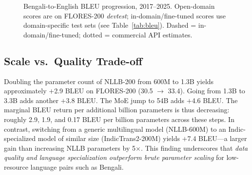 \documentclass[conference]{IEEEtran}
\begin{document}
\begin{figure}[htbp]
\centering
{}
\caption{Bengali-to-English BLEU progression, 2017--2025. Open-domain scores
are on FLORES-200 \textit{devtest}; in-domain/fine-tuned scores use
domain-specific test sets (see Table~\ref{tab:bleu}). Dashed = in-domain/fine-tuned;
dotted = commercial API estimates.}
\label{fig:bleu_trend}
\end{figure}

\subsection{Scale vs.\ Quality Trade-off}

Doubling the parameter count of NLLB-200 from 600M to 1.3B yields
approximately $+$2.9 BLEU on FLORES-200 (30.5 $\to$ 33.4).
Going from 1.3B to 3.3B adds another $+$3.8 BLEU.
The MoE jump to 54B adds $+$4.6 BLEU.
The marginal BLEU return per additional billion parameters is thus
decreasing: roughly 2.9, 1.9, and 0.17 BLEU per billion parameters
across these steps.
In contrast, switching from a generic multilingual model (NLLB-600M)
to an Indic-specialized model of similar size (IndicTrans2-200M) yields
$+$7.4 BLEU---a larger gain than increasing NLLB parameters by 5$\times$.
This finding underscores that \textit{data quality and language
specialization outperform brute parameter scaling} for low-resource
language pairs such as Bengali.
\end{document}
